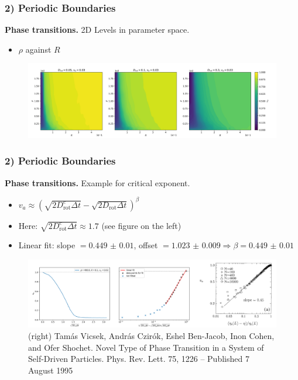 \begin{frame}
	\frametitle{2) Periodic Boundaries}
	\textbf{Phase transitions.} 2D Levels in parameter space.
	\begin{itemize}
	    \item $\rho$ against $R$
	\end{itemize}
	\begin{figure}[H]
  		\includegraphics[width=\textwidth]{images/chapter2/rho_r_transition_2D_plots_D_comparison.png} 
	\end{figure}
\end{frame}

\begin{frame}
	\frametitle{2) Periodic Boundaries}
	\textbf{Phase transitions.} Example for critical exponent.
	\begin{itemize}
	    \item $v_a \approx \left(\sqrt{2D_{\text{rot}}^c\Delta t} - \sqrt{2D_{\text{rot}}\Delta t}\right)^{\beta}$
	    \item Here: $\sqrt{2D_{\text{rot}}^c\Delta t} \approx 1.7$ (see figure on the left)
	    \item Linear fit: slope $=\num{0.449(10)}$, offset $=\num{1.023(9)} \Rightarrow \beta = \num{0.449(10)}$
	\end{itemize}
	\begin{figure}[H]
  		\includegraphics[width=\textwidth]{images/chapter2/pbc_critical_exponents.png} 
  		\caption*{(right) Tamás Vicsek, András Czirók, Eshel Ben-Jacob, Inon Cohen, and Ofer Shochet. Novel Type of Phase Transition in a System of Self-Driven Particles. Phys. Rev. Lett. 75, 1226 – Published 7 August 1995}
	\end{figure}
\end{frame}